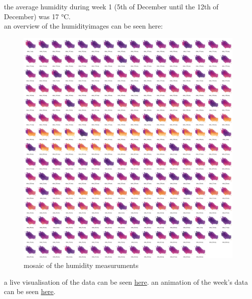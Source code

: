 \FloatBarrier 
the average humidity during week 1 (5th of December until the 12th of December) was 17 °C. \\an overview of the humidityimages can be seen here:\begin{figure}[hbt!] 
\centering 
\includegraphics[width=\textwidth]{reports/current_report/images/montage_humidity.jpg}  
\caption{mosaic of the humidity measuruments} 
\end{figure} 
\FloatBarrier 
a live visualisation of the data can be seen \href{https://data.hasdata.xyz/}{here}. an animation of the week's data can be seen \href{https://data.hasdata.xyz/}{here}. 